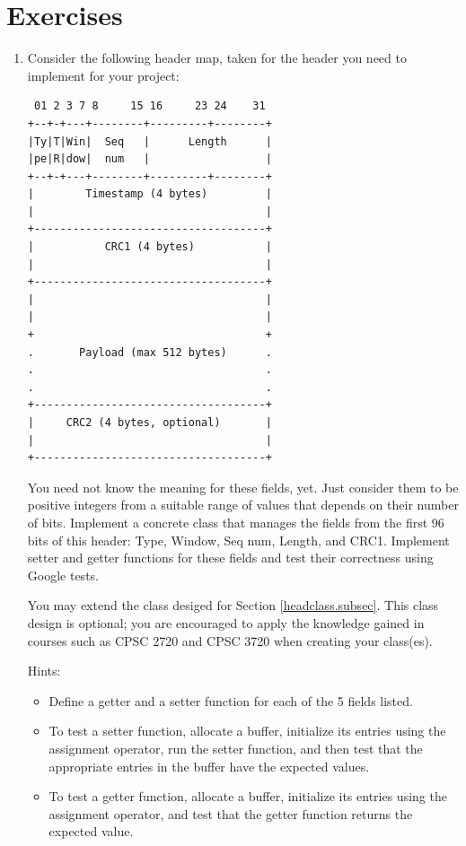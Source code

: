 \documentclass[12pt]{book}
\begin{document}
\section{Exercises}

\begin{enumerate}[label=\arabic*.]
\item Consider the following header map, taken for the header you need to implement for your project:
\begin{verbatim}
 01 2 3 7 8     15 16     23 24    31
+--+-+---+--------+---------+--------+
|Ty|T|Win|  Seq   |      Length      |
|pe|R|dow|  num   |                  |
+--+-+---+--------+---------+--------+
|        Timestamp (4 bytes)         |
|                                    |
+------------------------------------+
|           CRC1 (4 bytes)           |
|                                    |
+------------------------------------+
|                                    |
|                                    |
+                                    +
.       Payload (max 512 bytes)      .
.                                    .
.                                    .
+------------------------------------+
|     CRC2 (4 bytes, optional)       |
|                                    |
+------------------------------------+
\end{verbatim}

You need not know the meaning for these fields, yet. Just consider them to be positive integers from a suitable range of values that depends on their number of bits.
Implement a concrete class that manages the fields from the first 96 bits of this header: Type, Window, Seq num, Length, and CRC1. Implement setter and getter functions for these fields and test their correctness using Google tests.

You may extend the class desiged for Section \ref{headclass.subsec}. This class design is optional; you are encouraged to apply the knowledge gained in courses such as CPSC 2720 and CPSC 3720 when creating your class(es).

Hints:
\begin{itemize}[label=--]
\item Define a getter and a setter function for each of the 5 fields listed.
\item To test a setter function, allocate a buffer, initialize its entries using the assignment operator, run the setter function, and then test that the appropriate entries in the buffer have the expected values.
  \item To test a getter function, allocate a buffer, initialize its entries using the assignment operator, and test that the getter function returns the expected value.
\end{itemize}

\end{enumerate}
\end{document}
